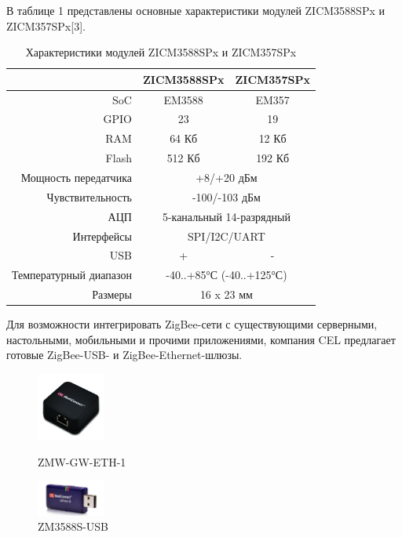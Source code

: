 \documentclass[11pt]{article}
\begin{document}
В таблице 1 представлены основные характеристики модулей ZICM3588SPx и ZICM357SPx[3].

\begin{table}[H]
    \begin{center}
    \caption{Характеристики модулей ZICM3588SPx и ZICM357SPx} 
    \begin{tabular}{|r|c|c|}
    \hline
    {} & \textbf{ZICM3588SPx} & \textbf{ZICM357SPx} \\
    \hline
    SoC & EM3588 & EM357 \\
    \hline
    GPIO & 23 & 19 \\
    \hline
    RAM & 64 Кб & 12 Кб \\
    \hline
    Flash & 512 Кб & 192 Кб \\
    \hline
    Мощность передатчика & \multicolumn{2}{c|}{+8/+20 дБм}\\
    \hline
    Чувствительность & \multicolumn{2}{c|}{-100/-103 дБм}\\
    \hline
    АЦП & \multicolumn{2}{c|}{5-канальный 14-разрядный}\\
    \hline
    Интерфейсы & \multicolumn{2}{c|}{SPI/I2C/UART}\\
    \hline
    USB & + & -\\
    \hline
    Температурный диапазон & \multicolumn{2}{c|}{-40..+85°С (-40..+125°С)}\\
    \hline
    Размеры & \multicolumn{2}{c|}{16 x 23 мм}\\
    \hline
    \end{tabular}
    \end{center}
\end{table}


Для возможности интегрировать ZigBee-сети с существующими серверными, настольными,
мобильными и прочими приложениями, компания CEL предлагает готовые ZigBee-USB- и 
ZigBee-Ethernet-шлюзы.

\begin{figure}
  \begin{center}
    \includegraphics[width=0.20\textwidth]{gateway2.jpg}
  \end{center}
  \caption{ZMW-GW-ETH-1}
  \begin{center}
    \includegraphics[width=0.20\textwidth]{usb_stick_em358_img_tech_plain.png}
  \end{center}
  \caption{ZM3588S-USB}
\end{figure}
\end{document}
